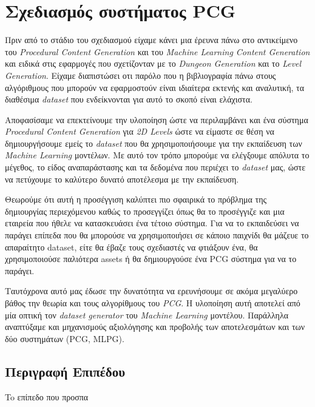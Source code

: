 \section{Σχεδιασμός συστήματος PCG}
Πριν από το στάδιο του σχεδιασμού είχαμε κάνει μια έρευνα πάνω στο αντικείμενο του \textit{Procedural Content Generation} και του  \textit{Machine Learning Content Generation} και ειδικά στις εφαρμογές που σχετίζονταν με το \textit{Dungeon Generation} και το \textit{Level Generation}. Είχαμε διαπιστώσει οτι παρόλο που η βιβλιογραφία πάνω στους αλγόριθμους που μπορούν να εφαρμοστούν είναι ιδιαίτερα εκτενής και αναλυτική, τα διαθέσιμα \textit{dataset} που ενδείκνονται για αυτό το σκοπό είναι ελάχιστα.
\par
Αποφασίσαμε να επεκτείνουμε την υλοποίηση ώστε να περιλαμβάνει και ένα σύστημα \textit{Procedural Content Generation} για \textit{2D Levels} ώστε να είμαστε σε θέση να δημιουργήσουμε εμείς το \textit{dataset} που θα χρησιμοποιήσουμε για την εκπαίδευση των \textit{Machine Learning} μοντέλων. Με αυτό τον τρόπο μπορούμε να ελέγξουμε απόλυτα το μέγεθος, το είδος αναπαράστασης και τα δεδομένα που περιέχει το \textit{dataset} μας, ώστε να πετύχουμε το καλύτερο δυνατό αποτέλεσμα με την εκπαίδευση.
\par
Θεωρούμε ότι αυτή η προσέγγιση καλύπτει πιο σφαιρικά το πρόβλημα της δημιουργίας περιεχόμενου καθώς το προσεγγίζει όπως θα το προσέγγιζε και μια εταιρεία που ήθελε να κατασκευάσει ένα τέτοιο σύστημα. Για να το εκπαιδεύσει να παράγει επίπεδα που θα μπορούσε να χρησιμοποιήσει σε κάποιο παιχνίδι θα μάζευε το απαραίτητο dataset, είτε θα έβαζε τους σχεδιαστές να φτιάξουν ένα, θα χρησιμοποιούσε παλιότερα assets ή θα δημιουργούσε ένα PCG σύστημα για να το παράγει.
\par
Ταυτόχρονα αυτό μας έδωσε την δυνατότητα να ερευνήσουμε σε ακόμα μεγαλύερο βάθος την θεωρία και τους αλγορίθμους του \textit{PCG}. Η υλοποίηση αυτή αποτελεί από μία οπτική τον \textit{dataset generator} του \textit{Machine Learning} μοντέλου. Παράλληλα αναπτύξαμε και μηχανισμούς αξιολόγησης και προβολής των αποτελεσμάτων και των δύο συστημάτων (PCG, MLPG).

\subsection{Περιγραφή Επιπέδου}
To επίπεδο που προσπα
























